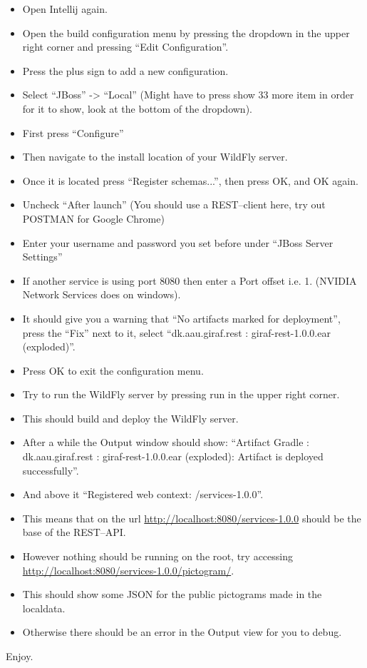 \begin{itemize}
    \item Open Intellij again.
    \item Open the build configuration menu by pressing the dropdown in the upper right corner and pressing ``Edit Configuration''.
    \item Press the plus sign to add a new configuration.
    \item Select ``JBoss'' -> ``Local'' (Might have to press show 33 more item in order for it to show, look at the bottom of the dropdown).
    \item First press ``Configure''
    \item Then navigate to the install location of your WildFly server.
    \item Once it is located press ``Register schemas...'', then press OK, and OK again.
    \item Uncheck ``After launch'' (You should use a REST--client here, try out POSTMAN for Google Chrome)
    \item Enter your username and password you set before under ``JBoss Server Settings''
    \item If another service is using port 8080 then enter a Port offset i.e. 1. (NVIDIA Network Services does on windows).
    \item It should give you a warning that ``No artifacts marked for deployment'', press the ``Fix'' next to it, select ``dk.aau.giraf.rest :
giraf-rest-1.0.0.ear (exploded)''.
    \item Press OK to exit the configuration menu.
    \item Try to run the WildFly server by pressing run in the upper right corner.
    \item This should build and deploy the WildFly server.
    \item After a while the Output window should show: ``Artifact Gradle : dk.aau.giraf.rest : giraf-rest-1.0.0.ear (exploded): Artifact is deployed
successfully''.
    \item And above it ``Registered web context: /services-1.0.0''.
    \item This means that on the url \url{http://localhost:8080/services-1.0.0} should be the base of the REST--API.
    \item However nothing should be running on the root, try accessing \url{http://localhost:8080/services-1.0.0/pictogram/}.
    \item This should show some JSON for the public pictograms made in the localdata.
    \item Otherwise there should be an error in the Output view for you to debug.
\end{itemize}

Enjoy.

